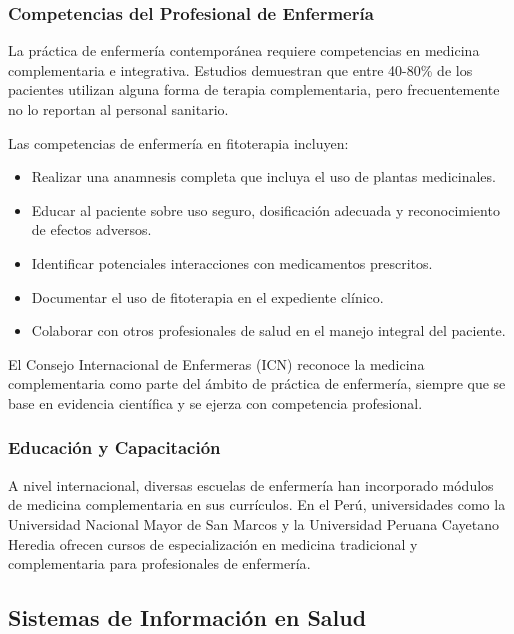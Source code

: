 \documentclass[12pt,a4paper]{article}
\begin{document}
\subsubsection{Competencias del Profesional de Enfermería}

La práctica de enfermería contemporánea requiere competencias en medicina complementaria e integrativa. Estudios demuestran que entre 40-80\% de los pacientes utilizan alguna forma de terapia complementaria, pero frecuentemente no lo reportan al personal sanitario\cite{Robinson2008}.

Las competencias de enfermería en fitoterapia incluyen:

\begin{itemize}
    \item Realizar una anamnesis completa que incluya el uso de plantas medicinales.
    \item Educar al paciente sobre uso seguro, dosificación adecuada y reconocimiento de efectos adversos.
    \item Identificar potenciales interacciones con medicamentos prescritos.
    \item Documentar el uso de fitoterapia en el expediente clínico.
    \item Colaborar con otros profesionales de salud en el manejo integral del paciente.
\end{itemize}

El Consejo Internacional de Enfermeras (ICN) reconoce la medicina complementaria como parte del ámbito de práctica de enfermería, siempre que se base en evidencia científica y se ejerza con competencia profesional\cite{ICN2014}.

\subsubsection{Educación y Capacitación}

A nivel internacional, diversas escuelas de enfermería han incorporado módulos de medicina complementaria en sus currículos. En el Perú, universidades como la Universidad Nacional Mayor de San Marcos y la Universidad Peruana Cayetano Heredia ofrecen cursos de especialización en medicina tradicional y complementaria para profesionales de enfermería\cite{UNMSM2020}.

\subsection{Sistemas de Información en Salud}
\end{document}
